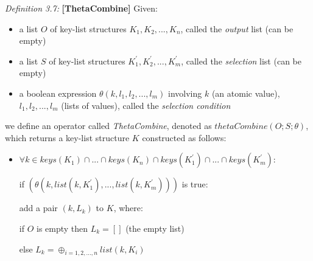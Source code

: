 \textit{Definition 3.7:} \textbf{[ThetaCombine]} Given:
    \begin{itemize}
        \item a list \(O\) of key-list structures \(K_1, K_2, ..., K_n\), called the \textit{output} list (can be empty)
        \item a list \(S\) of key-list structures \(K_1^{'}, K_2^{'}, ..., K_m^{'}\), called the \textit{selection} list (can be empty)
        \item a boolean expression \(\theta(k, l_1, l_2, ..., l_m)\) involving \(k\) (an atomic value), \(l_1, l_2, ..., l_m\) (lists of values), called the \textit{selection condition}
    \end{itemize}
we define an operator called \textit{ThetaCombine}, denoted as \(thetaCombine(O; S; \theta)\), which returns a key-list structure \(K\) constructed as follows:
\begin{itemize}
\item[] \(\forall k \in keys(K_1)\cap...\cap keys(K_n)\cap keys(K_1^{'}) \cap...\cap keys(K_m^{'})\):

   \quad if \((\theta (k, list(k, K_1^{'}), ..., list(k, K_m^{'})))\) is true:
        
        \quad \quad add a pair \((k, L_k)\) to \(K\), where:
            
            \quad \quad \quad if \(O\) is empty then \(L_k = []\) (the empty list)
            
            \quad \quad \quad else \(L_k = \oplus_{i = 1, 2, ..., n}list(k, K_i)\)\cite{chatziantoniou}
\end{itemize}


